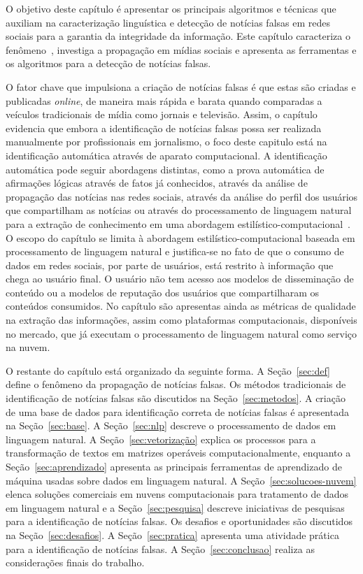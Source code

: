\documentclass{SBCbookchapter}
\begin{document}
O objetivo deste capítulo é apresentar os principais algoritmos e técnicas que auxiliam na caracterização linguística e detecção de notícias falsas em redes sociais para a garantia da integridade da informação. 
Este capítulo caracteriza o fenômeno~\cite{rubin2015deception,rubin2015towards}, investiga a propagação em mídias sociais e apresenta as ferramentas e os algoritmos para a detecção de notícias falsas.

O fator chave que impulsiona a criação de notícias falsas é que estas são criadas e publicadas {\it online}, de maneira mais rápida e barata quando comparadas a veículos tradicionais de mídia como jornais e televisão. Assim, o capítulo evidencia que embora a identificação de notícias falsas possa ser realizada manualmente por profissionais em jornalismo, o foco deste capitulo está na identificação automática através de aparato computacional. %
A identificação automática pode seguir abordagens distintas, como a prova automática de afirmações lógicas através de fatos já conhecidos, através da análise de propagação das notícias nas redes sociais, através da análise do perfil dos usuários que compartilham as notícias ou através do processamento de linguagem natural para a extração de conhecimento em uma abordagem estilístico-computacional~\cite{zhou2018fake}. O escopo do capítulo se limita à abordagem estilístico-computacional baseada em processamento de linguagem natural e justifica-se no fato de que o consumo de dados em redes sociais, por parte de usuários, está restrito à informação que chega ao usuário final. O usuário não tem acesso aos modelos de disseminação de conteúdo ou a modelos de reputação dos usuários que compartilharam os conteúdos consumidos. No capítulo são apresentas ainda as métricas de qualidade na extração das informações, assim como plataformas computacionais, disponíveis no mercado, que já executam o processamento de linguagem natural como serviço na nuvem. 

O restante do capítulo está organizado da seguinte forma. A Seção~\ref{sec:def} define o fenômeno da propagação de notícias falsas. Os métodos tradicionais de identificação de notícias falsas são discutidos na Seção~\ref{sec:metodos}. A criação de uma base de dados para identificação correta de notícias falsas é apresentada na Seção~\ref{sec:base}. A Seção~\ref{sec:nlp} descreve o processamento de dados em linguagem natural. A Seção~\ref{sec:vetorização} explica os processos para a transformação de textos em matrizes operáveis computacionalmente, enquanto a Seção~\ref{sec:aprendizado} apresenta as principais ferramentas de aprendizado de máquina usadas sobre dados em linguagem natural. A Seção~\ref{sec:solucoes-nuvem} elenca soluções comerciais em nuvens computacionais para tratamento de dados em linguagem natural e a Seção~\ref{sec:pesquisa} descreve iniciativas de pesquisas para a identificação de notícias falsas. Os desafios e oportunidades são discutidos na Seção~\ref{sec:desafios}. A Seção~\ref{sec:pratica} apresenta uma atividade prática para a identificação de notícias falsas. A Seção~\ref{sec:conclusao} realiza as considerações finais do trabalho.
\end{document}
